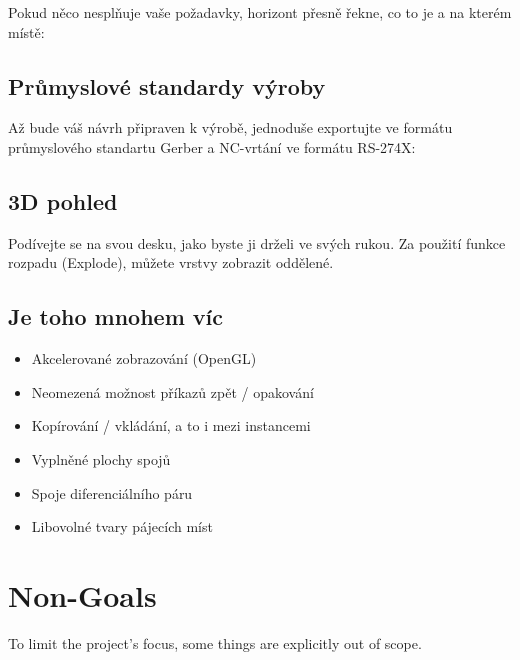\documentclass[letterpaper,10pt,czech]{sphinxmanual}
\begin{document}
\noindent{}

Pokud něco nesplňuje vaše požadavky, horizont přesně řekne, co to je a
na kterém místě:

\noindent{}


\section{Průmyslové standardy výroby}
\label{\detokenize{feature-overview:prumyslove-standardy-vyroby}}
Až bude váš návrh připraven k výrobě, jednoduše exportujte ve formátu
průmyslového standartu Gerber a NC-vrtání ve formátu RS-274X:

\noindent{}


\section{3D pohled}
\label{\detokenize{feature-overview:d-pohled}}
Podívejte se na svou desku, jako byste ji drželi ve svých rukou. Za použití funkce rozpadu (Explode), můžete vrstvy zobrazit oddělené.

\noindent{}


\section{Je toho mnohem víc}
\label{\detokenize{feature-overview:je-toho-mnohem-vic}}\begin{itemize}
\item {} 
Akcelerované zobrazování (OpenGL)

\item {} 
Neomezená možnost příkazů zpět / opakování

\item {} 
Kopírování / vkládání, a to i mezi instancemi

\item {} 
Vyplněné plochy spojů

\item {} 
Spoje diferenciálního páru

\item {} 
Libovolné tvary pájecích míst

\end{itemize}


\chapter{Non-Goals}
\label{\detokenize{non-goals:non-goals}}\label{\detokenize{non-goals::doc}}
To limit the project’s focus, some things are explicitly out of scope.
\end{document}

